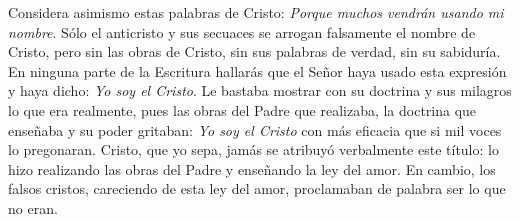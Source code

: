 \begin{body}
	Considera asimismo estas palabras de Cristo: \emph{Porque muchos vendrán usando mi nombre}. Sólo el anticristo y sus secuaces se arrogan falsamente el nombre de Cristo, pero sin las obras de Cristo, sin sus palabras de verdad, sin su sabiduría. En ninguna parte de la Escritura hallarás que el Señor haya usado esta expresión y haya dicho: \emph{Yo soy el Cristo}. Le bastaba mostrar con su doctrina y sus milagros lo que era realmente, pues las obras del Padre que realizaba, la doctrina que enseñaba y su poder gritaban: \emph{Yo soy el Cristo} con más eficacia que si mil voces lo pregonaran. Cristo, que yo sepa, jamás se atribuyó verbalmente este título: lo hizo realizando las obras del Padre y enseñando la ley del amor. En cambio, los falsos cristos, careciendo de esta ley del amor, proclamaban de palabra ser lo que no eran.				
\end{body}